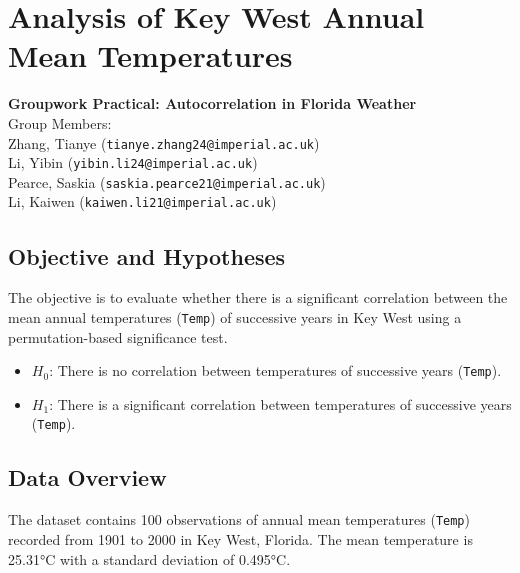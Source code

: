 \documentclass[a4paper,10pt]{article}
\begin{document}
\pagestyle{empty}

\section*{\centering Analysis of Key West Annual Mean Temperatures}

\begin{center}
    \textbf{Groupwork Practical: Autocorrelation in Florida Weather} \\
    Group Members: \\
    Zhang, Tianye (\texttt{tianye.zhang24@imperial.ac.uk}) \\
    Li, Yibin (\texttt{yibin.li24@imperial.ac.uk}) \\
    Pearce, Saskia (\texttt{saskia.pearce21@imperial.ac.uk}) \\
    Li, Kaiwen (\texttt{kaiwen.li21@imperial.ac.uk})
\end{center}

\subsection*{Objective and Hypotheses}
The objective is to evaluate whether there is a significant correlation between the mean annual temperatures (\texttt{Temp}) of successive years in Key West using a permutation-based significance test.

\begin{itemize}
    \item \(H_0\): There is no correlation between temperatures of successive years (\texttt{Temp}).
    \item \(H_1\): There is a significant correlation between temperatures of successive years (\texttt{Temp}).
\end{itemize}

\subsection*{Data Overview}
The dataset contains 100 observations of annual mean temperatures (\texttt{Temp}) recorded from 1901 to 2000 in Key West, Florida. The mean temperature is 25.31°C with a standard deviation of 0.495°C.
\end{document}
